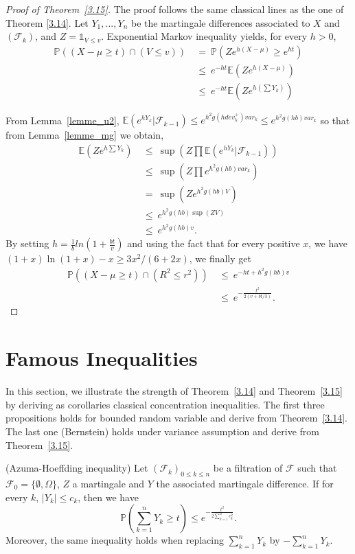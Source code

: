 \begin{proof}[Proof of Theorem~\ref{3.15}]
The proof follows the same classical lines as the one of Theorem \ref{3.14}.
Let $Y_1,...,Y_n$ be the martingale differences associated to $X$ and $(\mathcal{F}_k)$, and
$Z=\mathds{1}_{V \leq v}$. Exponential Markov inequality yields, for every $h > 0$,
 \begin{align*}
\mathbb{P}((X-\mu \geq t)\cap(V \leq v)) 
 &~=~ \mathbb{P}(Ze^{h(X-\mu)} \geq e^{ht})\\
 &~\leq~ e^{-ht}\mathbb{E}(Ze^{h(X-\mu)})\\
 &~\leq~ e^{-ht}\mathbb{E}(Ze^{h(\sum Y_k)}) 
 \end{align*}

From Lemma~\ref{lemme_u2}, 
$\mathbb{E}(e^{hY_k}|\mathcal{F}_{k-1}) \leq e^{h^2g(hdev_k^+)var_k} \leq e^{h^2g(hb)var_k}$ so that
from Lemma~\ref{lemme_mg} we obtain,
\begin{align*}
 \mathbb{E}(Ze^{h\sum Y_k}) &~\leq~ \sup(Z \prod \mathbb{E}(e^{hY_k}|\mathcal{F}_{k-1}))\\
& ~\leq~ \sup(Z \prod e^{h^2g(hb)var_k})\\
&~=~  \sup(Z e^{h^2g(hb)V})\\
&~\leq~ e^{h^2g(hb)\sup(ZV)}\\
&~\leq~ e^{h^2g(hb)v}.
\end{align*}
By setting $h=\frac{1}{b}ln(1+\frac{bt}{v})$ and using the fact that for every positive $x$, we have $(1+x)\ln(1+x)-x \geq 3x^2/(6+2x)$, we finally get
\begin{align*} \mathbb{P}((X-\mu \geq t)\cap(R^2 \leq r^2)) &~\leq~ e^{-ht+h^2g(hb)v}\\
&~\leq~ e^{-\frac{t^2}{2(v+bt/3)}}.
\end{align*}


\end{proof}


\section{Famous Inequalities}

In this section, we illustrate the strength of Theorem~\ref{3.14} and Theorem~\ref{3.15} by deriving as corollaries classical concentration inequalities.
The first three propositions holds for bounded random variable and derive from Theorem~\ref{3.14}. The last one (Bernstein) holds under variance assumption and derive from Theorem~\ref{3.15}.

\begin{proposition} ({\sc Azuma-Hoeffding inequality})
\label{HA3.10}
Let $(\mathcal{F}_k)_{0\leq k \leq n}$ be a filtration of $\mathcal{F}$ such that $\mathcal{F}_0 =  \{\emptyset , \Omega\} $, $Z$ a martingale and $Y$ the associated martingale difference.
If for every $k$, $|Y_{k}| \leq c_{k}$, then we have $$ \mathbb{P}(\sum_{k=1}^n Y_k \geq t) \leq e^{-\frac{t^2}{2 \sum_{k=1}^n c_k^2}}.$$ Moreover, the same inequality holds when replacing $\sum_{k=1}^n Y_k$ by $-\sum_{k=1}^n Y_k$.
\end{proposition}

